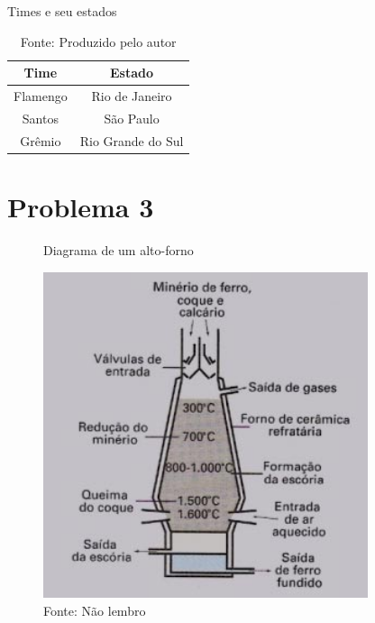 \documentclass[
	12pt,				%
	openright,			%
	twoside,			%
	a4paper,			%
	english,			%
	french,				%
	spanish,			%
	brazil,				%
	]{abntex2}
\begin{document}
\begin{table}[!h]
   \centering
   \caption{Times e seu estados}
   \begin{tabular}{cc}
   \toprule
   Time & Estado \\
   \midrule
   Flamengo & Rio de Janeiro \\
   Santos & São Paulo \\
   Grêmio & Rio Grande do Sul \\
   \bottomrule
   \end{tabular}
   \caption*{Fonte: Produzido pelo autor}
\end{table}

\newpage

\section*{Problema 3}

\begin{figure}[!h]
   \centering
   \caption{Diagrama de um alto-forno}
   \includegraphics[width=0.85\textwidth,height=0.65\textwidth]{altoforno}
   \caption*{Fonte: Não lembro}
   \label{forno}
\end{figure}
\end{document}
